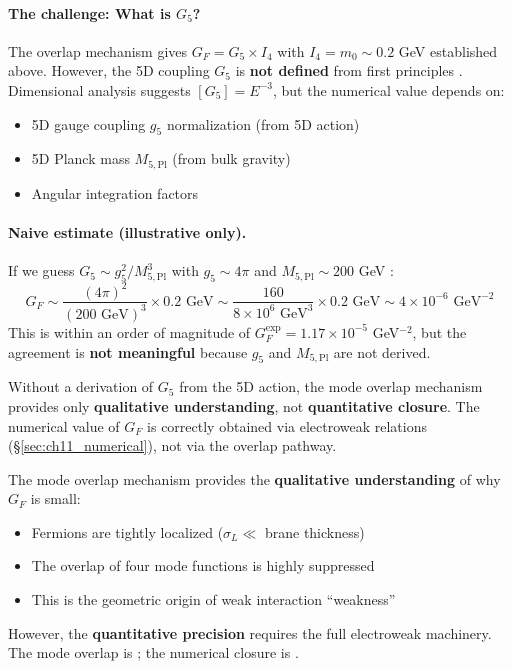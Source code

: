 \paragraph{The challenge: What is $G_5$?}
The overlap mechanism gives $G_F = G_5 \times I_4$ with $I_4 = m_0 \sim 0.2$ GeV
established above. However, the 5D coupling $G_5$ is \textbf{not defined} from
first principles \tagP{}. Dimensional analysis suggests $[G_5] = E^{-3}$, but
the numerical value depends on:
\begin{itemize}[nosep]
    \item 5D gauge coupling $g_5$ normalization (from 5D action)
    \item 5D Planck mass $M_{5,\mathrm{Pl}}$ (from bulk gravity)
    \item Angular integration factors
\end{itemize}

\paragraph{Naive estimate (illustrative only).}
If we guess $G_5 \sim g_5^2/M_{5,\mathrm{Pl}}^3$ with $g_5 \sim 4\pi$ and
$M_{5,\mathrm{Pl}} \sim 200$ GeV \tagP{}:
\begin{equation}
    G_F \sim \frac{(4\pi)^2}{(200 \text{ GeV})^3} \times 0.2 \text{ GeV}
    \sim \frac{160}{8 \times 10^6 \text{ GeV}^3} \times 0.2 \text{ GeV}
    \sim 4 \times 10^{-6} \text{ GeV}^{-2}
    \label{eq:ch11_GF_estimate}
\end{equation}
This is within an order of magnitude of $G_F^{\text{exp}} = 1.17 \times 10^{-5}$
GeV$^{-2}$, but the agreement is \textbf{not meaningful} because $g_5$ and
$M_{5,\mathrm{Pl}}$ are not derived.

\begin{tcolorbox}[colback=red!5, colframe=red!50!black,
    title=\textbf{Honest Assessment: $G_5$ Is Open (OPR-19)}]
Without a derivation of $G_5$ from the 5D action, the mode overlap mechanism
provides only \textbf{qualitative understanding}, not \textbf{quantitative
closure}. The numerical value of $G_F$ is correctly obtained via electroweak
relations (§\ref{sec:ch11_numerical}), not via the overlap pathway.
\end{tcolorbox}

\begin{tcolorbox}[colback=yellow!5, colframe=orange!60!black,
    title=\textbf{Honest Assessment: Mode Overlap Status (YELLOW-B)}]
The mode overlap mechanism provides the \textbf{qualitative understanding}
of why $G_F$ is small:
\begin{itemize}[nosep]
    \item Fermions are tightly localized ($\sigma_L \ll$ brane thickness)
    \item The overlap of four mode functions is highly suppressed
    \item This is the geometric origin of weak interaction ``weakness''
\end{itemize}

However, the \textbf{quantitative precision} requires the full electroweak
machinery. The mode overlap is \tagP{}; the numerical closure is \tagDc{}.
\end{tcolorbox}

